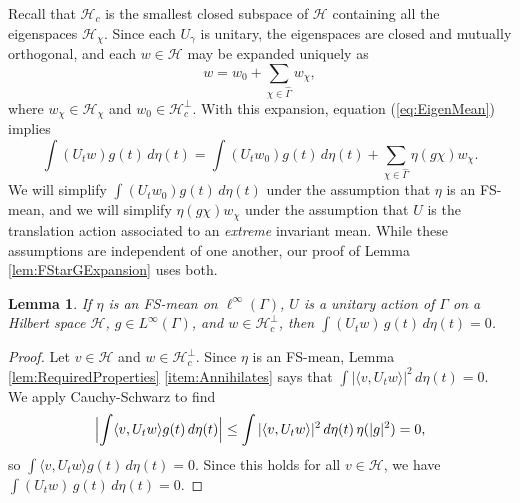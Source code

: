 \documentclass[12pt]{amsart} \usepackage{amsmath,centernot,amssymb,leftindex}
\newtheorem{lemma}[theorem]{Lemma}
\numberwithin{theorem}{section}
\numberwithin{equation}{section}
\theoremstyle{definition}
\begin{document}
Recall that $\mathcal H_c$ is the smallest closed subspace of $\mathcal H$ containing all the eigenspaces $\mathcal H_{\chi}$.  Since each $U_\gamma$ is unitary, the eigenspaces are closed and mutually orthogonal, and each $w\in \mathcal H$ may be expanded uniquely as 
	\[w=w_0+\sum_{\chi\in\widehat{\Gamma}} w_\chi,\] where $w_\chi\in \mathcal H_\chi$ and $w_0\in \mathcal H_c^\perp$.  With this expansion, equation (\ref{eq:EigenMean}) implies
	\begin{equation}\label{eq:EUetag}
	 \int (U_{t}w) g(t)\, d\eta(t) = 	 \int (U_{t}w_{0}) g(t)\, d\eta(t)+ \sum_{\chi\in\widehat{\Gamma}} \eta(g\chi) w_{\chi}.
	\end{equation}
We will simplify $\int (U_{t}w_{0}) g(t)\, d\eta(t)$ under the assumption that $\eta$ is an FS-mean, and we will simplify $\eta(g\chi)w_{\chi}$ under the assumption that $U$ is the translation action associated to an \emph{extreme} invariant mean.  While these assumptions are independent of one another,  our proof of Lemma \ref{lem:FStarGExpansion} uses both.  


\begin{lemma}\label{lem:FSannihilates}
	If $\eta$ is an FS-mean on $\ell^{\infty}(\Gamma)$, $U$ is a unitary action of $\Gamma$ on a Hilbert space $\mathcal H$,  $g\in L^{\infty}(\Gamma)$, and $w\in \mathcal H_{c}^{\perp}$, then $\int (U_{t}w)\, g(t)\, d\eta(t)=0$.
\end{lemma}
\begin{proof}
Let $v\in \mathcal H$ and $w\in \mathcal H_{c}^{\perp}$. Since $\eta$ is an FS-mean, Lemma \ref{lem:RequiredProperties} \ref{item:Annihilates} says that $\int |\langle v, U_{t}w\rangle|^{2}\, d\eta(t)=0$.
We apply Cauchy-Schwarz to find
	\[
	\Bigl|\int \langle v,U_{t}w \rangle g(t) \, d\eta(t)\Bigr| \leq  \int |\langle v, U_{t}w\rangle|^{2}\, d\eta(t)\, \eta(|g|^{2}) =0,
	\]
	so $\int \langle v,U_{t}w \rangle g(t) \, d\eta(t)=0$.  Since this holds for all $v\in \mathcal H$, we have $\int (U_{t}w)\, g(t)\, d\eta(t)=0$.	
\end{proof}
\end{document}
